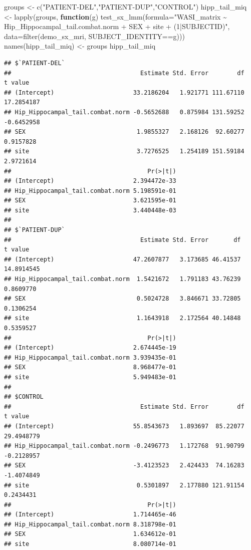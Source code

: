 \documentclass[
]{article}
\newenvironment{Shaded}{\begin{snugshade}}{\end{snugshade}}
\newcommand{\AttributeTok}[1]{\textcolor[rgb]{0.77,0.63,0.00}{#1}}
\newcommand{\ControlFlowTok}[1]{\textcolor[rgb]{0.13,0.29,0.53}{\textbf{#1}}}
\newcommand{\FunctionTok}[1]{\textcolor[rgb]{0.00,0.00,0.00}{#1}}
\newcommand{\NormalTok}[1]{#1}
\newcommand{\OtherTok}[1]{\textcolor[rgb]{0.56,0.35,0.01}{#1}}
\newcommand{\SpecialCharTok}[1]{\textcolor[rgb]{0.00,0.00,0.00}{#1}}
\newcommand{\StringTok}[1]{\textcolor[rgb]{0.31,0.60,0.02}{#1}}
\begin{document}
\begin{Shaded}
\begin{Highlighting}[]
\NormalTok{groups }\OtherTok{\textless{}{-}} \FunctionTok{c}\NormalTok{(}\StringTok{"PATIENT{-}DEL"}\NormalTok{,}\StringTok{"PATIENT{-}DUP"}\NormalTok{,}\StringTok{"CONTROL"}\NormalTok{)}
\NormalTok{hipp\_tail\_miq }\OtherTok{\textless{}{-}} \FunctionTok{lapply}\NormalTok{(groups, }\ControlFlowTok{function}\NormalTok{(g) }\FunctionTok{test\_sx\_lmm}\NormalTok{(}\AttributeTok{formula=}\StringTok{"WASI\_matrix \textasciitilde{} Hip\_Hippocampal\_tail.combat.norm + SEX + site  + (1|SUBJECTID)"}\NormalTok{, }\AttributeTok{data=}\FunctionTok{filter}\NormalTok{(demo\_sx\_mri, SUBJECT\_IDENTITY}\SpecialCharTok{==}\NormalTok{g)))}
\FunctionTok{names}\NormalTok{(hipp\_tail\_miq) }\OtherTok{\textless{}{-}}\NormalTok{ groups}
\NormalTok{hipp\_tail\_miq}
\end{Highlighting}
\end{Shaded}

\begin{verbatim}
## $`PATIENT-DEL`
##                                    Estimate Std. Error        df    t value
## (Intercept)                      33.2186204   1.921771 111.67110 17.2854187
## Hip_Hippocampal_tail.combat.norm -0.5652688   0.875984 131.59252 -0.6452958
## SEX                               1.9855327   2.168126  92.60277  0.9157828
## site                              3.7276525   1.254189 151.59184  2.9721614
##                                      Pr(>|t|)
## (Intercept)                      2.394472e-33
## Hip_Hippocampal_tail.combat.norm 5.198591e-01
## SEX                              3.621595e-01
## site                             3.440448e-03
## 
## $`PATIENT-DUP`
##                                    Estimate Std. Error       df    t value
## (Intercept)                      47.2607877   3.173685 46.41537 14.8914545
## Hip_Hippocampal_tail.combat.norm  1.5421672   1.791183 43.76239  0.8609770
## SEX                               0.5024728   3.846671 33.72805  0.1306254
## site                              1.1643918   2.172564 40.14848  0.5359527
##                                      Pr(>|t|)
## (Intercept)                      2.674445e-19
## Hip_Hippocampal_tail.combat.norm 3.939435e-01
## SEX                              8.968477e-01
## site                             5.949483e-01
## 
## $CONTROL
##                                    Estimate Std. Error        df    t value
## (Intercept)                      55.8543673   1.893697  85.22077 29.4948779
## Hip_Hippocampal_tail.combat.norm -0.2496773   1.172768  91.90799 -0.2128957
## SEX                              -3.4123523   2.424433  74.16283 -1.4074849
## site                              0.5301897   2.177880 121.91154  0.2434431
##                                      Pr(>|t|)
## (Intercept)                      1.714465e-46
## Hip_Hippocampal_tail.combat.norm 8.318798e-01
## SEX                              1.634612e-01
## site                             8.080714e-01
\end{verbatim}
\end{document}
